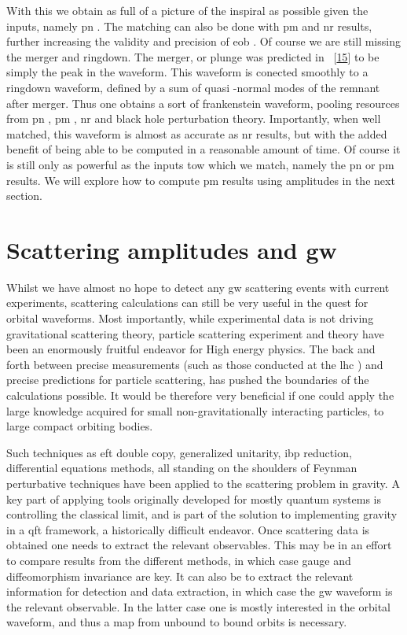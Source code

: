 \documentclass[
  10pt,
  a4paper,
  DIV=11,
  numbers=noendperiod,
  oneside]{scrreprt}
\DeclareRobustCommand{\[}{\begin{equation}}
\DeclareRobustCommand{\]}{\end{equation}}
\begin{document}
With this we obtain as full of a picture of the inspiral as possible
given the inputs, namely \gls{pn} . The matching can also be done with
\gls{pm} and \gls{nr} results, further increasing the validity and
precision of \gls{eob} . Of course we are still missing the merger and
ringdown. The merger, or plunge was predicted in
~{[}\protect\hyperlink{ref-Buonanno:2000ef}{15}{]} to be simply the peak
in the waveform. This waveform is conected smoothly to a ringdown
waveform, defined by a sum of quasi -normal modes of the remnant after
merger. Thus one obtains a sort of frankenstein waveform, pooling
resources from \gls{pn} , \gls{pm} , \gls{nr} and black hole
perturbation theory. Importantly, when well matched, this waveform is
almost as accurate as \gls{nr} results, but with the added benefit of
being able to be computed in a reasonable amount of time. Of course it
is still only as powerful as the inputs tow which we match, namely the
\gls{pn} or \gls{pm} results. We will explore how to compute \gls{pm}
results using amplitudes in the next section.


\hypertarget{scattering-amplitudes-and-gws}{%
\chapter{\texorpdfstring{Scattering amplitudes and
\gls{gw}}{Scattering amplitudes and }}\label{scattering-amplitudes-and-gws}}

Whilst we have almost no hope to detect any \gls{gw} scattering events
with current experiments, scattering calculations can still be very
useful in the quest for orbital waveforms. Most importantly, while
experimental data is not driving gravitational scattering theory,
particle scattering experiment and theory have been an enormously
fruitful endeavor for High energy physics. The back and forth between
precise measurements (such as those conducted at the \gls{lhc} ) and
precise predictions for particle scattering, has pushed the boundaries
of the calculations possible. It would be therefore very beneficial if
one could apply the large knowledge acquired for small
non-gravitationally interacting particles, to large compact orbiting
bodies.

Such techniques as \gls{eft} double copy, generalized unitarity,
\gls{ibp} reduction, differential equations methods, all standing on the
shoulders of Feynman perturbative techniques have been applied to the
scattering problem in gravity. A key part of applying tools originally
developed for mostly quantum systems is controlling the classical limit,
and is part of the solution to implementing gravity in a \gls{qft}
framework, a historically difficult endeavor. Once scattering data is
obtained one needs to extract the relevant observables. This may be in
an effort to compare results from the different methods, in which case
gauge and diffeomorphism invariance are key. It can also be to extract
the relevant information for detection and data extraction, in which
case the \gls{gw} waveform is the relevant observable. In the latter
case one is mostly interested in the orbital waveform, and thus a map
from unbound to bound orbits is necessary.
\end{document}
